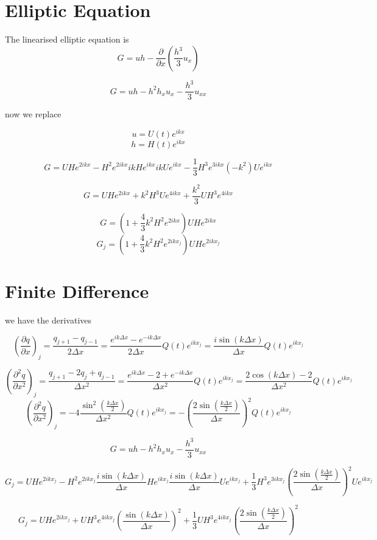 \documentclass[12pt]{article}
\begin{document}
\section{Elliptic Equation}
The linearised elliptic equation is
\[G = uh - \frac{\partial}{\partial x}\left(\frac{h^3}{3}u_x\right)\]

\[G = uh - h^2h_xu_x - \frac{h^3}{3}u_{xx}\]

now we replace

\[u = U(t)e^{ikx}\]
\[h = H(t)e^{ikx}\]

\[G = UH e^{2ikx} - H^2 e^{2ikx} ikH e^{ikx} ikU e^{ikx}  - \frac{1}{3} H^3 e^{3ikx} (-k^2 )U e^{ikx}\]

\[G = UH e^{2ikx} +k^2 H^3U e^{4ikx}  +  \frac{k^2}{3} UH^3 e^{4ikx}\]

\[G = \left(1 + \frac{4}{3}k^2 H^2 e^{2ikx} \right)UH e^{2ikx}\]
\[G_j = \left(1 + \frac{4}{3}k^2 H^2 e^{2ikx_j} \right)UH e^{2ikx_j}\]

\section{Finite Difference}

we have the derivatives

\[\left(\frac{\partial q}{\partial x}\right)_j= \frac{q_{j+1} - q_{j-1}}{2\Delta x} = \frac{e^{ik\Delta x} - e^{-ik\Delta x}}{2\Delta x} Q(t)e^{ikx_j} =\frac{i\sin\left(k\Delta x\right)}{\Delta x} Q(t)e^{ikx_j} \]

\[\left(\frac{\partial^2 q}{\partial x^2}\right)_j= \frac{q_{j+1} -2q_j + q_{j-1}}{\Delta x^2} = \frac{e^{ik\Delta x} - 2 + e^{-ik\Delta x}}{\Delta x^2} Q(t)e^{ikx_j} =\frac{2\cos\left(k\Delta x\right) - 2}{\Delta x^2} Q(t)e^{ikx_j} \]
\[\left(\frac{\partial^2 q}{\partial x^2}\right)_j=  -4\frac{\sin^2\left(\frac{k\Delta x}{2}\right)}{\Delta x^2} Q(t)e^{ikx_j} =  - \left(\frac{2\sin\left(\frac{k\Delta x}{2}\right)}{\Delta x}\right)^2 Q(t)e^{ikx_j}\]

\[G = uh - h^2h_xu_x - \frac{h^3}{3}u_{xx}\]

\[G_j = UH e^{2ikx_j} - H^2 e^{2ikx_j} \frac{i\sin\left(k\Delta x\right)}{\Delta x} He^{ikx_j} \frac{i\sin\left(k\Delta x\right)}{\Delta x} Ue^{ikx_j}  + \frac{1}{3} H^3 e^{3ikx_j} \left(\frac{2\sin\left(\frac{k\Delta x}{2}\right)}{\Delta x}\right)^2 Ue^{ikx_j}\]

\[G_j = UH e^{2ikx_j} + UH^3 e^{4ikx_j} \left(\frac{\sin\left(k\Delta x\right)}{\Delta x}\right)^2  + \frac{1}{3} UH^3 e^{4ikx_j} \left(\frac{2\sin\left(\frac{k\Delta x}{2}\right)}{\Delta x}\right)^2\]
\end{document}
